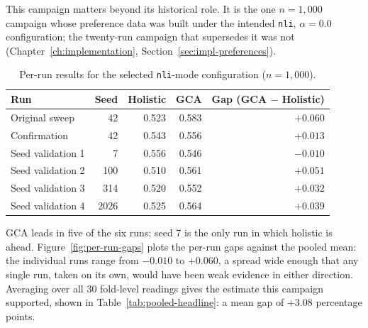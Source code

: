 This campaign matters beyond its historical role. It is the one $n=1{,}000$
campaign whose preference data was built under the intended \texttt{nli},
$\alpha=0.0$ configuration; the twenty-run campaign that supersedes it was
not (Chapter~\ref{ch:implementation}, Section~\ref{sec:impl-preferences}).

\begin{table}[htbp]
\centering
\caption[Per-run results for the selected configuration]{Per-run results for the selected \texttt{nli}-mode configuration
($n=1{,}000$).}
\label{tab:seed-validation}
\begin{tabular}{lrrrr}
\toprule
Run & Seed & Holistic & GCA & Gap (GCA $-$ Holistic) \\
\midrule
Original sweep       & 42   & 0.523 & 0.583 & $+0.060$ \\
Confirmation          & 42   & 0.543 & 0.556 & $+0.013$ \\
Seed validation 1    & 7    & 0.556 & 0.546 & $-0.010$ \\
Seed validation 2    & 100  & 0.510 & 0.561 & $+0.051$ \\
Seed validation 3    & 314  & 0.520 & 0.552 & $+0.032$ \\
Seed validation 4    & 2026 & 0.525 & 0.564 & $+0.039$ \\
\bottomrule
\end{tabular}
\end{table}

GCA leads in five of the six runs; seed 7 is the only run in which holistic is
ahead. Figure~\ref{fig:per-run-gaps} plots the per-run gaps against the pooled
mean: the individual runs range from $-0.010$ to $+0.060$, a spread wide enough
that any single run, taken on its own, would have been weak evidence in either
direction. Averaging over all 30 fold-level readings gives the estimate this
campaign supported, shown in Table~\ref{tab:pooled-headline}: a mean gap of
$+3.08$ percentage points.

